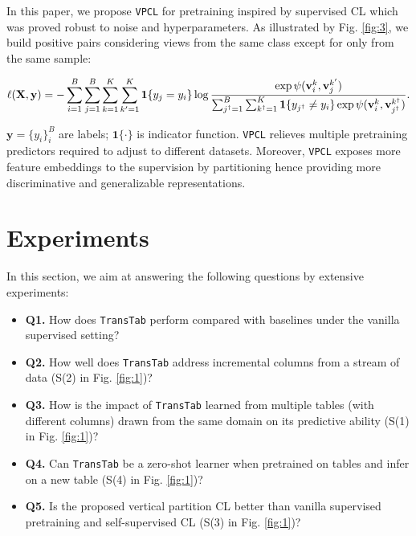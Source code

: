 In this paper, we propose \texttt{VPCL} for pretraining inspired by supervised CL \cite{khosla2020supervised} which was proved robust to noise and hyperparameters. As illustrated by Fig. \ref{fig:3}, we build positive pairs considering views from the same class except for only from the same sample:

\begin{equation}\label{eq:mscl}
    \ell({\rm \mathbf{X}},\mathbf{y}) = -\sum_{i=1}^B \sum_{j=1}^B\sum_{k=1}^K \sum_{k^\prime=1}^K \mathbf{1}\{y_j=y_i\}  \log \frac{\exp \psi(\mathbf{v}_i^k, \mathbf{v}_j^{k^\prime})}{\sum_{j^\dag=1}^B \sum_{k^\dag=1}^K \mathbf{1}\{y_{j^\dag}\neq y_i\} \exp \psi(\mathbf{v}_i^k, \mathbf{v}_{j^\dag}^{k^\dag})  }.
\end{equation}

$\mathbf{y}=\{y_i\}_{i}^B$ are labels; $\mathbf{1}\{\cdot\}$ is indicator function. \texttt{VPCL} relieves multiple pretraining predictors required to adjust to different datasets. Moreover, \texttt{VPCL} exposes more feature embeddings to the supervision by partitioning hence providing more discriminative and generalizable representations.

\section{Experiments}\label{sec:experiment}
In this section, we aim at answering the following questions by extensive experiments:

\begin{itemize}[leftmargin=*, itemsep=0pt, labelsep=5pt]
    \item \textbf{Q1.} How does \texttt{TransTab} perform compared with baselines under the vanilla supervised setting?
    \item \textbf{Q2.} How well does \texttt{TransTab} address incremental columns from a stream of data (S(2) in Fig. \ref{fig:1})?
    \item \textbf{Q3.} How is the impact of \texttt{TransTab} learned from multiple tables (with different columns) drawn from the same domain on its predictive ability (S(1) in Fig. \ref{fig:1})?
    \item \textbf{Q4.} Can \texttt{TransTab} be a zero-shot learner when pretrained on tables and infer on a new table (S(4) in Fig. \ref{fig:1})?
    \item \textbf{Q5.} Is the proposed vertical partition CL better than vanilla supervised pretraining and self-supervised CL (S(3) in Fig. \ref{fig:1})?
\end{itemize}


